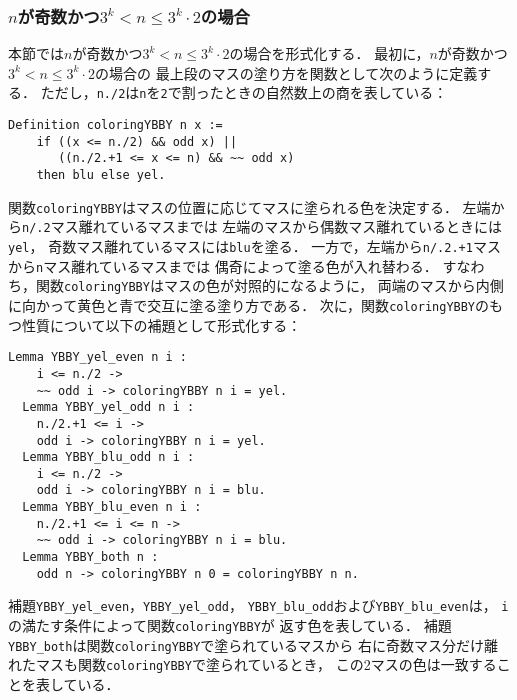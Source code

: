 \subsubsection{$n$が奇数かつ$3^{k} < n \leq 3^{k} \cdot 2$の場合}
本節では$n$が奇数かつ$3^{k} < n \leq 3^{k} \cdot 2$の場合を形式化する．
最初に，$n$が奇数かつ$3^{k} < n \leq 3^{k} \cdot 2$の場合の
最上段のマスの塗り方を関数として次のように定義する．
ただし，{\tt{n./2}}は{\tt{n}}を{\tt{2}}で割ったときの自然数上の商を表している：
\begin{lstlisting}[language=Coq]
  Definition coloringYBBY n x :=
    if ((x <= n./2) && odd x) ||
       ((n./2.+1 <= x <= n) && ~~ odd x)
    then blu else yel.
\end{lstlisting}
関数{\tt{coloringYBBY}}はマスの位置に応じてマスに塗られる色を決定する．
左端から{\tt{n/.2}}マス離れているマスまでは
左端のマスから偶数マス離れているときには{\tt{yel}}，
奇数マス離れているマスには{\tt{blu}}を塗る．
一方で，左端から{\tt{n/.2.+1}}マスから{\tt{n}}マス離れているマスまでは
偶奇によって塗る色が入れ替わる．
すなわち，関数{\tt{coloringYBBY}}はマスの色が対照的になるように，
両端のマスから内側に向かって黄色と青で交互に塗る塗り方である．
次に，関数{\tt{coloringYBBY}}のもつ性質について以下の補題として形式化する：
\begin{lstlisting}[language=Coq]
  Lemma YBBY_yel_even n i :
    i <= n./2 ->
    ~~ odd i -> coloringYBBY n i = yel.
  Lemma YBBY_yel_odd n i :
    n./2.+1 <= i ->
    odd i -> coloringYBBY n i = yel.
  Lemma YBBY_blu_odd n i :
    i <= n./2 ->
    odd i -> coloringYBBY n i = blu.
  Lemma YBBY_blu_even n i :
    n./2.+1 <= i <= n ->
    ~~ odd i -> coloringYBBY n i = blu.
  Lemma YBBY_both n :
    odd n -> coloringYBBY n 0 = coloringYBBY n n.
\end{lstlisting}
補題{\tt{YBBY\_yel\_even}}，{\tt{YBBY\_yel\_odd}}，
{\tt{YBBY\_blu\_odd}}および{\tt{YBBY\_blu\_even}}は，
{\tt{i}}の満たす条件によって関数{\tt{coloringYBBY}}が
返す色を表している．
補題{\tt{YBBY\_both}}は関数{\tt{coloringYBBY}}で塗られているマスから
右に奇数マス分だけ離れたマスも関数{\tt{coloringYBBY}}で塗られているとき，
この2マスの色は一致することを表している．


